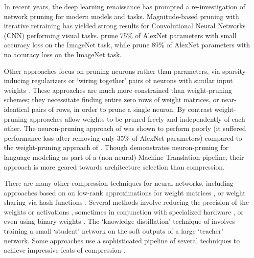 In recent years, the deep learning renaissance has prompted a re-investigation of network pruning for modern models and tasks. 
Magnitude-based pruning with iterative retraining has yielded strong results for Convolutional Neural Networks (CNN) performing visual tasks.
\cite{collins2014memory} prune 75\% of AlexNet parameters with small accuracy loss on the ImageNet task, while \cite{han2015learning} prune 89\% of AlexNet parameters with no accuracy loss on the ImageNet task.

Other approaches focus on pruning neurons rather than parameters, via sparsity-inducing regularizers \cite{murray2015auto} or `wiring together' pairs of neurons with similar input weights \cite{srinivas2015data}. These approaches are much more constrained than weight-pruning schemes; they necessitate finding entire zero rows of weight matrices, or near-identical pairs of rows, in order to prune a single neuron. By contrast weight-pruning approaches allow weights to be pruned freely and independently of each other. The neuron-pruning approach of \cite{srinivas2015data} was shown to perform poorly (it suffered performance loss after removing only 35\% of AlexNet parameters) compared to the weight-pruning approach of \cite{han2015learning}. 
Though \cite{murray2015auto} demonstrates neuron-pruning for language modeling as part of a (non-neural) Machine Translation pipeline, their approach is more geared towards architecture selection than compression.

There are many other compression techniques for neural networks, including approaches based on on low-rank approximations for weight matrices \cite{jaderberg2014speeding,denton2014exploiting}, or weight sharing  via hash functions \cite{chen2015compressing}.
Several methods involve reducing the precision of the weights or activations \cite{courbariaux2014low}, sometimes in conjunction with specialized hardware \cite{gupta2015deep}, or even using binary weights \cite{lin2015neural}.
The `knowledge distillation' technique of \cite{hinton2015distilling} involves training a small `student' network on the soft outputs of a large `teacher' network.
Some approaches use a sophisticated pipeline of several techniques to achieve impressive feats of compression \cite{han2015deep,iandola2016squeezenet}.

